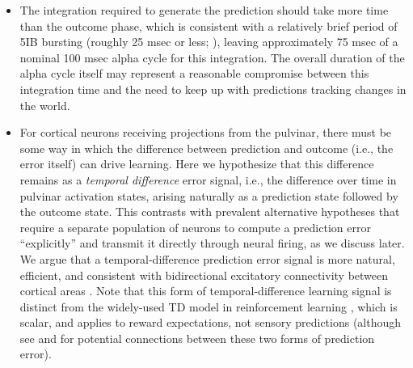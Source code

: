 \documentclass[11pt,twoside]{article}
\newif\myifpdf
\begin{document}
\begin{itemize}
		\item The integration required to generate the prediction should take more time than the outcome phase, which is consistent with a relatively brief period of 5IB bursting (roughly 25 msec or less; \citealp{ConnorsGutnickPrince82}), leaving approximately 75 msec of a nominal 100 msec alpha cycle for this integration.  The overall duration of the alpha cycle itself may represent a reasonable compromise between this integration time and the need to keep up with predictions tracking changes in the world.

	\item For cortical neurons receiving projections from the pulvinar, there must be some way in which the difference between prediction and outcome (i.e., the error itself) can drive learning.  Here we hypothesize that this difference remains as a \emph{temporal difference} error signal, i.e., the difference over time in pulvinar activation states, arising naturally as a prediction state followed by the outcome state.  This contrasts with prevalent alternative hypotheses that require a separate population of neurons to compute a prediction error ``explicitly'' and transmit it directly through neural firing, as we discuss later.  We argue that a temporal-difference prediction error signal is more natural, efficient, and consistent with bidirectional excitatory connectivity between cortical areas \citep{RumelhartMcClelland82,Hopfield84,DesimoneDuncan95,ReynoldsChelazziDesimone99,MillerCohen01,OReillyWyatteHerdEtAl13}.  Note that this form of temporal-difference learning signal is distinct from the widely-used TD model in reinforcement learning \citep{SuttonBarto98}, which is scalar, and applies to reward expectations, not sensory predictions (although see \citealp{GardnerSchoenbaumGershman18} and \citealp{Dayan93} for potential connections between these two forms of prediction error).


\end{itemize}
\end{document}
